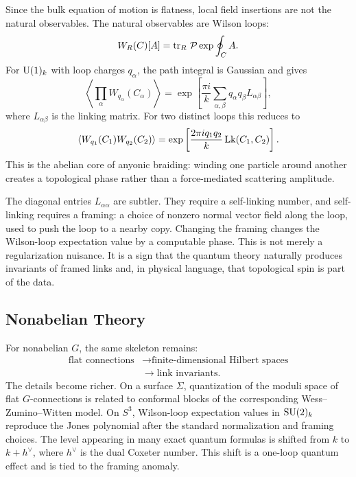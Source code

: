Since the bulk equation of motion is flatness, local field insertions are not the natural observables. The natural observables are Wilson loops:
\begin{equation}
  W_R(C)[A]
  =
  \operatorname{tr}_R\,\mathcal P\exp\oint_C A.
  \label{eq:synthesis-wilson}
\end{equation}
For $\operatorname{U}(1)_k$ with loop charges $q_\alpha$, the path integral is Gaussian and gives
\begin{equation}
  \left\langle\prod_\alpha W_{q_\alpha}(C_\alpha)\right\rangle
  =
  \exp\left[
  \frac{\pi i}{k}\sum_{\alpha,\beta}
  q_\alpha q_\beta L_{\alpha\beta}
  \right],
  \label{eq:synthesis-abelian-linking}
\end{equation}
where $L_{\alpha\beta}$ is the linking matrix. For two distinct loops this reduces to
\begin{equation}
  \langle W_{q_1}(C_1)W_{q_2}(C_2)\rangle
  =
  \exp\left[
  \frac{2\pi i q_1q_2}{k}\operatorname{Lk}(C_1,C_2)
  \right].
  \label{eq:synthesis-two-loop}
\end{equation}
This is the abelian core of anyonic braiding: winding one particle around another creates a topological phase rather than a force-mediated scattering amplitude.

The diagonal entries $L_{\alpha\alpha}$ are subtler. They require a self-linking number, and self-linking requires a framing: a choice of nonzero normal vector field along the loop, used to push the loop to a nearby copy. Changing the framing changes the Wilson-loop expectation value by a computable phase. This is not merely a regularization nuisance. It is a sign that the quantum theory naturally produces invariants of framed links and, in physical language, that topological spin is part of the data.


\subsection{Nonabelian Theory}
\label{subsec:synthesis-nonabelian}

For nonabelian $G$, the same skeleton remains:
\[
\begin{aligned}
  \text{flat connections}
  &\longrightarrow
  \text{finite-dimensional Hilbert spaces}
  \\
  &\longrightarrow
  \text{link invariants}.
\end{aligned}
\]
The details become richer. On a surface $\Sigma$, quantization of the moduli space of flat $G$-connections is related to conformal blocks of the corresponding Wess--Zumino--Witten model. On $S^3$, Wilson-loop expectation values in $\operatorname{SU}(2)_k$ reproduce the Jones polynomial after the standard normalization and framing choices. The level appearing in many exact quantum formulas is shifted from $k$ to $k+h^\vee$, where $h^\vee$ is the dual Coxeter number. This shift is a one-loop quantum effect and is tied to the framing anomaly.

